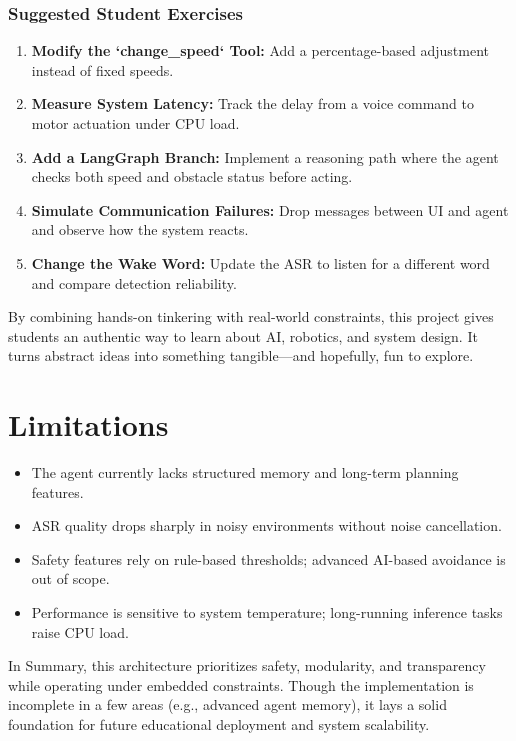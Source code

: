 \subsubsection*{Suggested Student Exercises}

\begin{enumerate}
    \item \textbf{Modify the `change\_speed` Tool:} Add a percentage-based adjustment instead of fixed speeds.
    \item \textbf{Measure System Latency:} Track the delay from a voice command to motor actuation under CPU load.
    \item \textbf{Add a LangGraph Branch:} Implement a reasoning path where the agent checks both speed and obstacle status before acting.
    \item \textbf{Simulate Communication Failures:} Drop messages between UI and agent and observe how the system reacts.
    \item \textbf{Change the Wake Word:} Update the ASR to listen for a different word and compare detection reliability.
    
\end{enumerate}

By combining hands-on tinkering with real-world constraints, this project gives students an authentic way to learn about AI, robotics, and system design. It turns abstract ideas into something tangible—and hopefully, fun to explore.


\section{Limitations}

\begin{itemize}
  \item The agent currently lacks structured memory and long-term planning features.
  \item ASR quality drops sharply in noisy environments without noise cancellation.
  \item Safety features rely on rule-based thresholds; advanced AI-based avoidance is out of scope.
  \item Performance is sensitive to system temperature; long-running inference tasks raise CPU load.
\end{itemize}

In Summary, this architecture prioritizes safety, modularity, and transparency while operating under embedded constraints. Though the implementation is incomplete in a few areas (e.g., advanced agent memory), it lays a solid foundation for future educational deployment and system scalability.\\


